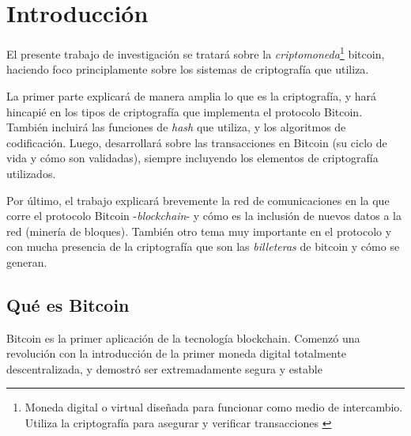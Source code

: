 







\clearpage
\tableofcontents
\clearpage 

\lstset{style=bashstyle}

\section{Introducción}

El presente trabajo de investigación se tratará sobre la \emph{criptomoneda}\footnote{Moneda digital o virtual diseñada para funcionar como medio de intercambio. Utiliza la criptografía para asegurar y verificar transacciones \autocite{CointelegraphBitcoin}} bitcoin, haciendo foco principlamente sobre los sistemas de criptografía que utiliza. 

La primer parte explicará de manera amplia lo que es la criptografía, y hará hincapié en los tipos de criptografía que implementa el protocolo Bitcoin. También incluirá las funciones de \emph{hash} que utiliza, y los algoritmos de codificación. Luego, desarrollará sobre las transacciones en Bitcoin (su ciclo de vida y cómo son validadas), siempre incluyendo los elementos de criptografía utilizados.

Por último, el trabajo explicará brevemente la red de comunicaciones en la que corre el protocolo Bitcoin -\emph{blockchain}- y cómo es la inclusión de nuevos datos a la red (minería de bloques). También otro tema muy importante en el protocolo y con mucha presencia de la criptografía que son las \emph{billeteras} de bitcoin y cómo se generan. 

\subsection{Qué es Bitcoin}

Bitcoin es la primer aplicación de la tecnología blockchain. Comenzó una revolución con la introducción de la primer moneda digital totalmente descentralizada, y demostró ser extremadamente segura y estable \autocite{MasteringBlockchainBitcoin}

